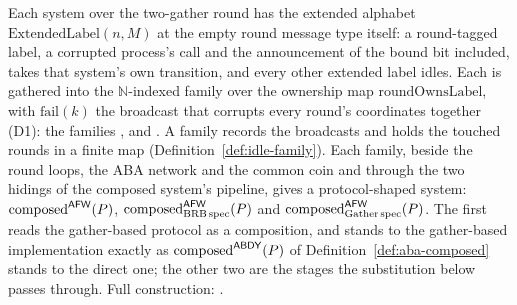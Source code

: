 \begin{definition}
  \label{def:aba-afw-round-families}
  \leanok
  Each system over the two-gather round has the extended alphabet $\mathrm{ExtendedLabel}(n, M)$ at the empty round message type itself: a round-tagged label, a corrupted process's call and the announcement of the bound bit included, takes that system's own transition, and every other extended label idles.
  Each is gathered into the $\mathbb{N}$-indexed family over the ownership map $\mathrm{roundOwnsLabel}$, with $\mathrm{fail}(k)$ the broadcast that corrupts every round's coordinates together (D1): the families ,  and .
  A family records the broadcasts and holds the touched rounds in a finite map (Definition~\ref{def:idle-family}).
  Each family, beside the round loops, the ABA network and the common coin and through the two hidings of the composed system's pipeline, gives a protocol-shaped system: $\mathrm{composed}^{\mathsf{AFW}}(P)$, $\mathrm{composed}^{\mathsf{AFW}}_{\mathrm{BRB}\,\mathrm{spec}}(P)$ and $\mathrm{composed}^{\mathsf{AFW}}_{\mathrm{Gather}\,\mathrm{spec}}(P)$. The first reads the gather-based protocol as a composition, and stands to the gather-based implementation exactly as $\mathrm{composed}^{\mathsf{ABDY}}(P)$ of Definition~\ref{def:aba-composed} stands to the direct one; the other two are the stages the substitution below passes through.
  Full construction: .
\end{definition}
